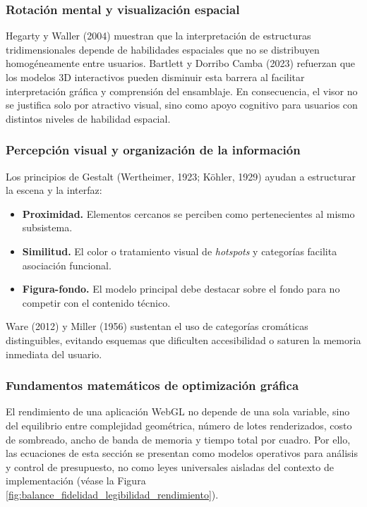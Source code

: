 \subsubsection{Rotación mental y visualización espacial}

Hegarty y Waller (2004) muestran que la interpretación de estructuras tridimensionales depende de habilidades espaciales que no se distribuyen homogéneamente entre usuarios. Bartlett y Dorribo Camba (2023) refuerzan que los modelos 3D interactivos pueden disminuir esta barrera al facilitar interpretación gráfica y comprensión del ensamblaje. En consecuencia, el visor no se justifica solo por atractivo visual, sino como apoyo cognitivo para usuarios con distintos niveles de habilidad espacial.

\subsubsection{Percepción visual y organización de la información}

Los principios de Gestalt (Wertheimer, 1923; Köhler, 1929) ayudan a estructurar la escena y la interfaz:
\begin{itemize}
    \item \textbf{Proximidad.} Elementos cercanos se perciben como pertenecientes al mismo subsistema.
    \item \textbf{Similitud.} El color o tratamiento visual de \textit{hotspots} y categorías facilita asociación funcional.
    \item \textbf{Figura-fondo.} El modelo principal debe destacar sobre el fondo para no competir con el contenido técnico.
\end{itemize}

Ware (2012) y Miller (1956) sustentan el uso de categorías cromáticas distinguibles, evitando esquemas que dificulten accesibilidad o saturen la memoria inmediata del usuario.

\subsubsection{Fundamentos matemáticos de optimización gráfica}

El rendimiento de una aplicación WebGL no depende de una sola variable, sino del equilibrio entre complejidad geométrica, número de lotes renderizados, costo de sombreado, ancho de banda de memoria y tiempo total por cuadro. Por ello, las ecuaciones de esta sección se presentan como modelos operativos para análisis y control de presupuesto, no como leyes universales aisladas del contexto de implementación (véase la Figura \ref{fig:balance_fidelidad_legibilidad_rendimiento}).

